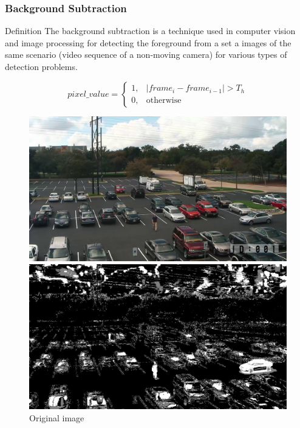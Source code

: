 \documentclass{beamer}
\begin{document}
\begin{frame}[allowframebreaks]
\frametitle{Background Subtraction}
\begin{block}{Definition}
The background subtraction is a technique used in computer vision and image processing for detecting the foreground from a set a images of the same scenario (video sequence of a non-moving camera) for various types of detection problems.

\[
pixel\_value= 
\begin{cases}
1,& |frame_i - frame_{i-1}| > T_h\\
0,              & \text{otherwise}
\end{cases}
\]
\end{block}
\vspace{5cm}
\begin{figure}[!htbp]
	\begin{minipage}[b]{0.48\textwidth}
		\includegraphics[width=\textwidth]{Pictures/fg308}
		\caption{Original image}
		\label{foreground}
	\end{minipage}
	\hfill
	\begin{minipage}[b]{0.48\textwidth}
		\includegraphics[width=\textwidth]{Pictures/bg308}

\end{minipage}
\end{figure}
\end{frame}
\end{document}
